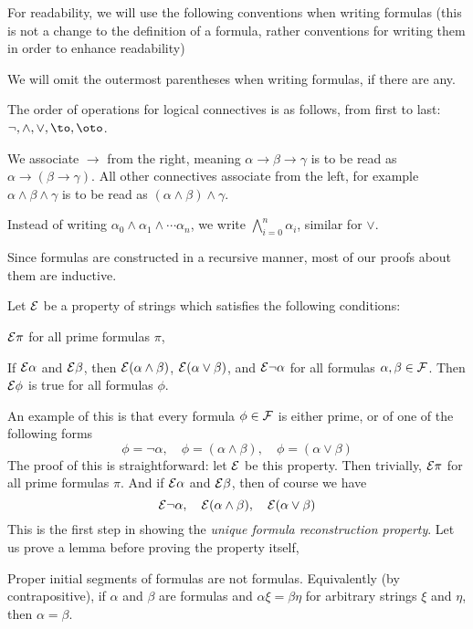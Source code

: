For readability, we will use the following conventions when writing formulas (this is not a change to the definition of a formula, rather conventions for writing them in order to enhance readability)
\benum
    \item We will omit the outermost parentheses when writing formulas, if there are any.
    \item The order of operations for logical connectives is as follows, from first to last: $\neg,\land,\lor,\to,\oto$.
    \item We associate $\to$ from the right, meaning $\alpha\to\beta\to\gamma$ is to be read as $\alpha\to(\beta\to\gamma)$.
    All other connectives associate from the left, for example $\alpha\land\beta\land\gamma$ is to be read as $(\alpha\land\beta)\land\gamma$.
    \item Instead of writing $\alpha_0\land\alpha_1\land\cdots\alpha_n$, we write $\bigwedge_{i=0}^n\alpha_i$, similar for $\lor$.
\eenum

Since formulas are constructed in a recursive manner, most of our proofs about them are inductive.

\bprin[title=Principle of Formula Induction, hyperlink=predforminduct]

    Let ${\cal E}$ be a property of strings which satisfies the following conditions:
    \benum
        \item ${\cal E}\pi$ for all prime formulas $\pi$,
        \item If ${\cal E}\alpha$ and ${\cal E}\beta$, then ${\cal E}(\alpha\land\beta)$, ${\cal E}(\alpha\lor\beta)$, and ${\cal E}\neg\alpha$ for all formulas $\alpha,\beta\in{\cal F}$.
    \eenum
    Then ${\cal E}\phi$ is true for all formulas $\phi$.

\eprin

An example of this is that every formula $\phi\in{\cal F}$ is either prime, or of one of the following forms
$$ \phi=\neg\alpha,\quad\phi=(\alpha\land\beta),\quad\phi=(\alpha\lor\beta) $$
The proof of this is straightforward: let ${\cal E}$ be this property.
Then trivially, ${\cal E}\pi$ for all prime formulas $\pi$.
And if ${\cal E}\alpha$ and ${\cal E}\beta$, then of course we have
$$ {\cal E}\neg\alpha,\quad{\cal E}(\alpha\land\beta),\quad{\cal E}(\alpha\lor\beta) $$
This is the first step in showing the {\it unique formula reconstruction property}.
Let us prove a lemma before proving the property itself,

\blemm

    Proper initial segments of formulas are not formulas.
    Equivalently (by contrapositive), if $\alpha$ and $\beta$ are formulas and $\alpha\xi=\beta\eta$ for arbitrary strings $\xi$ and $\eta$, then $\alpha=\beta$.

